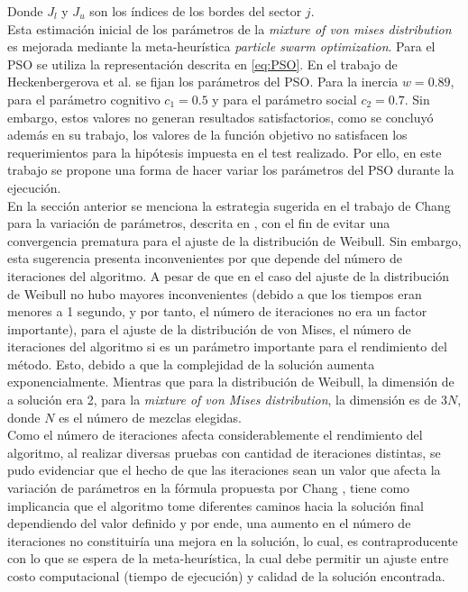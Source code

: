 Donde $J_l$ y $J_u$ son los índices de los bordes del sector $j$.\\
Esta estimación inicial de los parámetros de la \emph{mixture of von mises distribution} es mejorada mediante la meta-heurística \emph{particle swarm optimization}. Para el PSO se utiliza la representación descrita en \ref{eq:PSO}. En el trabajo de Heckenbergerova et al. \cite{Heckenbergerova15} se fijan los parámetros del PSO. Para la inercia $w = 0.89$, para el parámetro cognitivo $c_1 = 0.5$ y para el parámetro social $c_2 = 0.7$. Sin embargo, estos valores no generan resultados satisfactorios, como se concluyó además en su trabajo, los valores de la función objetivo no satisfacen los requerimientos para la hipótesis impuesta en el test realizado. Por ello, en este trabajo se propone una forma de hacer variar los parámetros del PSO durante la ejecución.\\ 
En la sección anterior se menciona la estrategia sugerida en el trabajo de Chang \cite{Chang10_2} para la variación de parámetros, descrita en \label{eq:VariationParameters}, con el fin de evitar una convergencia prematura para el ajuste de la distribución de Weibull. Sin embargo, esta sugerencia presenta inconvenientes por que depende del número de iteraciones del algoritmo. A pesar de que en el caso del ajuste de la distribución de Weibull no hubo mayores inconvenientes (debido a que los tiempos eran menores a 1 segundo, y por tanto, el número de iteraciones no era un factor importante), para el ajuste de la distribución de von Mises, el número de iteraciones del algoritmo si es un parámetro importante para el rendimiento del método. Esto, debido a que la complejidad de la solución aumenta exponencialmente. Mientras que para la distribución de Weibull, la dimensión de a solución era 2, para la \emph{mixture of von Mises distribution}, la dimensión es de $3N$, donde $N$ es el número de mezclas elegidas.\\
Como el número de iteraciones afecta considerablemente el rendimiento del algoritmo, al realizar diversas pruebas con cantidad de iteraciones distintas, se pudo evidenciar que el hecho de que las iteraciones sean un valor que afecta la variación de parámetros en la fórmula propuesta por Chang \label{eq:VariationParameters}, tiene como implicancia que el algoritmo tome diferentes caminos hacia la solución final dependiendo del valor definido y por ende, una aumento en el número de iteraciones no constituiría una mejora en la solución, lo cual, es contraproducente con lo que se espera de la meta-heurística, la cual debe permitir un ajuste entre costo computacional (tiempo de ejecución) y calidad de la solución encontrada.\\
